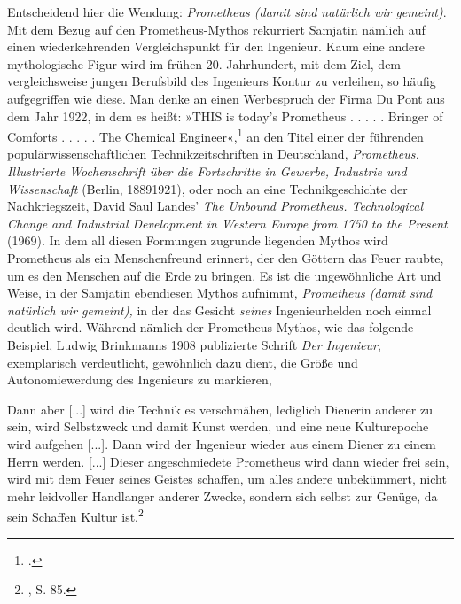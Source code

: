 \documentclass[%
	fontsize=10pt,%
	twoside,%
	headings=optiontoheadandtoc,%
	showtrims]{scrbook}
\renewenvironment{quote}{%
  \addmargin[\genericindent]{0pt}%
  \KOMAoptions{parskip=true}%
  \ifdim\parskip>0pt\else\addvspace{\intextsep}\fi
}{%
  \par
  \endaddmargin\vspace{\intextsep}
}
\begin{document}
\par Entscheidend hier die Wendung: \emph{Prometheus (damit sind natürlich wir gemeint)}. Mit dem Bezug auf den Prometheus-Mythos rekurriert Samjatin nämlich auf einen wiederkehrenden Vergleichspunkt für den Ingenieur. Kaum eine andere mythologische Figur wird im frühen 20. Jahrhundert, mit dem Ziel, dem vergleichsweise jungen Berufsbild des Ingenieurs Kontur zu verleihen, so häufig aufgegriffen wie diese. Man denke an einen Werbespruch der Firma Du Pont aus dem Jahr 1922, in dem es heißt: »THIS is today\textquoteright{}s Prometheus . . . . . Bringer of Comforts . . . . . The Chemical Engineer«,\footnote{\cite[][]{ov1922a}.}  an den Titel einer der führenden populärwissenschaftlichen Technikzeitschriften in Deutschland, \emph{Prometheus. Illustrierte Wochenschrift über die Fortschritte in Gewerbe, Industrie und Wissenschaft} (Berlin, 1889\textendash{}1921), oder noch an eine Technikgeschichte der Nachkriegszeit, David Saul Landes\textquoteright{} \emph{The Unbound Prometheus. Technological Change and Industrial Development in Western Europe from 1750 to the Present} (1969). In dem all diesen Formungen zugrunde liegenden Mythos wird Prometheus als ein Menschenfreund erinnert, der den Göttern das Feuer raubte, um es den Menschen auf die Erde zu bringen. Es ist die ungewöhnliche Art und Weise, in der Samjatin ebendiesen Mythos aufnimmt, \emph{Prometheus (damit sind natürlich wir gemeint),} in der das Gesicht \emph{seines} Ingenieurhelden noch einmal deutlich wird. Während nämlich der Prometheus-Mythos, wie das folgende Beispiel, Ludwig Brinkmanns 1908 publizierte Schrift \emph{Der Ingenieur}, exemplarisch verdeutlicht, gewöhnlich dazu dient, die Größe und Autonomiewerdung des Ingenieurs zu markieren,\begin{quote}
\par Dann aber {[}...{]} wird die Technik es verschmähen, lediglich Dienerin anderer zu sein, wird Selbstzweck und damit Kunst werden, und eine neue Kulturepoche wird aufgehen {[}...{]}. Dann wird der Ingenieur wieder aus einem Diener zu einem Herrn werden. {[}...{]} Dieser angeschmiedete Prometheus wird dann wieder frei sein, wird mit dem Feuer seines Geistes schaffen, um alles andere unbekümmert, nicht mehr leidvoller Handlanger anderer Zwecke, sondern sich selbst zur Genüge, da sein Schaffen Kultur ist.\footnote{\cite[][]{brinkmann1908a}, S. 85.} 
\end{quote}
\end{document}
